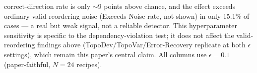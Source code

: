 \begin{table}[t]
{correct-direction rate is only $\sim$9 points above chance, and the effect exceeds
ordinary valid-reordering noise (Exceeds-Noise rate, not shown) in only 15.1\% of cases
--- a real but weak signal, not a reliable detector. This hyperparameter sensitivity is
specific to the dependency-violation test; it does not affect the valid-reordering
findings above (TopoDev/TopoVar/Error-Recovery replicate at both $\epsilon$ settings),
which remain this paper's central claim.
All columns use $\epsilon=0.1$ (paper-faithful, $N=24$ recipes).
}%
\label{tab:diagnostics}
\end{table}
